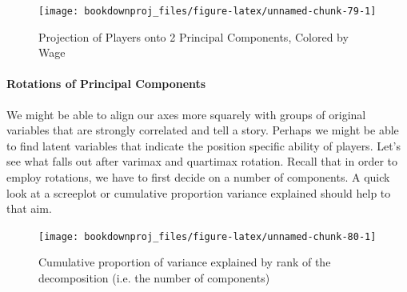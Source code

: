 \documentclass[
]{article}
\newenvironment{Shaded}{\begin{snugshade}}{\end{snugshade}}
\newcommand{\AttributeTok}[1]{\textcolor[rgb]{0.77,0.63,0.00}{#1}}
\newcommand{\DecValTok}[1]{\textcolor[rgb]{0.00,0.00,0.81}{#1}}
\newcommand{\FunctionTok}[1]{\textcolor[rgb]{0.00,0.00,0.00}{#1}}
\newcommand{\NormalTok}[1]{#1}
\newcommand{\SpecialCharTok}[1]{\textcolor[rgb]{0.00,0.00,0.00}{#1}}
\newcommand{\StringTok}[1]{\textcolor[rgb]{0.31,0.60,0.02}{#1}}
\theoremstyle{definition}
\theoremstyle{definition}
\theoremstyle{definition}
\theoremstyle{definition}
\theoremstyle{remark}
\begin{document}
\begin{figure}

{\centering \texttt{[image: bookdownproj\_files/figure-latex/unnamed-chunk-79-1]} 

}

\caption{Projection of Players onto 2 Principal Components, Colored by Wage}\label{fig:unnamed-chunk-79}
\end{figure}

\hypertarget{rotations-of-principal-components}{%
\paragraph{Rotations of Principal Components}\label{rotations-of-principal-components}}

We might be able to align our axes more squarely with groups of original variables that are strongly correlated and tell a story. Perhaps we might be able to find latent variables that indicate the position specific ability of players. Let's see what falls out after varimax and quartimax rotation. Recall that in order to employ rotations, we have to first decide on a number of components. A quick look at a screeplot or cumulative proportion variance explained should help to that aim.

\begin{Shaded}
\end{Shaded}

\begin{figure}

{\centering \texttt{[image: bookdownproj\_files/figure-latex/unnamed-chunk-80-1]} 

}

\caption{Cumulative proportion of variance explained by rank of the decomposition (i.e. the number of components)}\label{fig:unnamed-chunk-80}
\end{figure}
\end{document}
